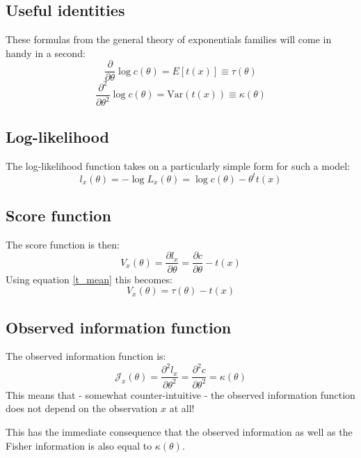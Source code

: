 \documentclass[12pt, a4paper]{article}
\numberwithin{equation}{section}
\begin{document}
\subsection{Useful identities}
These formulas from the general theory of exponentials families will come in handy in a second:
\begin{equation}
\label{t_mean}
\frac{\partial}{\partial\theta}\log c(\theta)=E[t(x)]\equiv\tau(\theta)
\end{equation}
\begin{equation}
\label{t_variance}
\frac{\partial^2}{\partial\theta^2}\log c(\theta)=\textrm{Var}(t(x))\equiv\kappa(\theta)
\end{equation}

\subsection{Log-likelihood}
The log-likelihood function takes on a particularly simple form for such a model:
\begin{equation}
l_x(\theta)=-\log L_x(\theta)=\log c(\theta)-\theta^t t(x)
\end{equation}

\subsection{Score function}
The score function is then:
\begin{equation}
V_x(\theta)=\frac{\partial l_x}{\partial\theta}=\frac{\partial c}{\partial\theta}-t(x)
\end{equation}
Using equation \ref{t_mean} this becomes:
\begin{equation}
V_x(\theta)=\tau(\theta)-t(x)
\end{equation}

\subsection{Observed information function}
The observed information function is:
\begin{equation}
\mathcal{J}_x(\theta)=\frac{\partial^2 l_x}{\partial\theta^2}=\frac{\partial^2 c}{\partial\theta^2}=\kappa(\theta)
\end{equation}
This means that - somewhat counter-intuitive - the observed information function does not depend on the observation $x$ at all!

This has the immediate consequence that the observed information as well as the Fisher information is also equal to $\kappa(\theta)$. 
\end{document}
